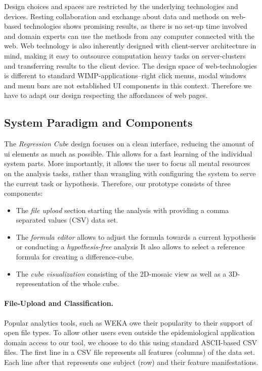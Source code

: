 \documentclass[journal]{style/vgtc} 			          %
\newcommand{\com}[1]{\textcolor{orange}{\uline{#1}}}
\begin{document}
\noindent Design choices and spaces are restricted by the underlying technologies and devices.
Resting collaboration and exchange about data and methods on web-based technologies shows promising results, as there is no set-up time involved and domain experts can use the methods from any computer connected with the web.
Web technology is also inherently designed with client-server architecture in mind, making it easy to outsource computation heavy tasks on server-clusters and transferring results to the client device.
The design space of web-technologies is different to standard WIMP-applications--right click menus, modal windows and menu bars are not established UI components in this context.
Therefore we have to adapt our design respecting the affordances of web pages.
\subsection{System Paradigm and Components}
The \emph{Regression Cube} design focuses on a clean interface, reducing the amount of ui elements as much as possible.
This allows for a fast learning of the individual system parts.
More importantly, it allows the user to focus all mental resources on the analysis tasks, rather than wrangling with configuring the system to serve the current task or hypothesis.
Therefore, our prototype consists of three components:
\begin{itemize}
	\item The \emph{file upload} section starting the analysis with providing a comma separated values (CSV) data set.
	\item The \emph{formula editor} allows to adjust the formula towards a current hypothesis or conducting a \emph{hypothesis-free} analysis
	It also allows to select a reference formula for creating a difference-cube.
	\item The \emph{cube visualization} consisting of the 2D-mosaic view as well as a 3D-representation of the whole cube.
\end{itemize}
\paragraph{File-Upload and Classification.}
Popular analytics tools, such as WEKA \cite{WEKA} owe their popularity to their support of open file types.
To allow other users even outside the epidemiological application domain access to our tool, we choose to do this using standard ASCII-based CSV files.
The first line in a CSV file represents all features (columns) of the data set.
Each line after that represents one subject (row) and their feature manifestations.
\end{document}
